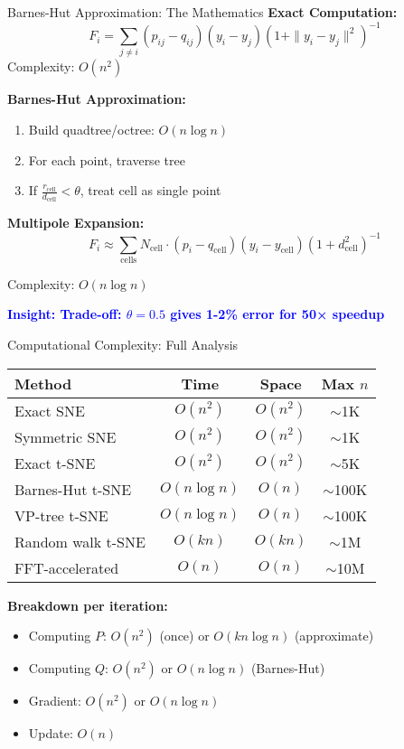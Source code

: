 \documentclass[aspectratio=169]{beamer}
\newcommand{\conceptbox}[2]{\colorbox{#1!20}{\textcolor{#1}{\textbf{#2}}}}
\newcommand{\insight}[1]{\conceptbox{blue}{Insight: #1}}
\begin{document}
\begin{frame}{Barnes-Hut Approximation: The Mathematics}
\textbf{Exact Computation:}
$$F_i = \sum_{j \neq i} (p_{ij} - q_{ij})(y_i - y_j)(1 + \|y_i - y_j\|^2)^{-1}$$
Complexity: $O(n^2)$

\textbf{Barnes-Hut Approximation:}
\begin{enumerate}
\item Build quadtree/octree: $O(n \log n)$
\item For each point, traverse tree
\item If $\frac{r_{\text{cell}}}{d_{\text{cell}}} < \theta$, treat cell as single point
\end{enumerate}

\textbf{Multipole Expansion:}
$$F_i \approx \sum_{\text{cells}} N_{\text{cell}} \cdot (p_i - q_{\text{cell}})(y_i - y_{\text{cell}})(1 + d_{\text{cell}}^2)^{-1}$$

Complexity: $O(n \log n)$

\insight{Trade-off: $\theta = 0.5$ gives 1-2\% error for 50× speedup}
\end{frame}

\begin{frame}{Computational Complexity: Full Analysis}
\begin{center}
\begin{tabular}{l|c|c|c}
\textbf{Method} & \textbf{Time} & \textbf{Space} & \textbf{Max $n$} \\
\hline
Exact SNE & $O(n^2)$ & $O(n^2)$ & $\sim$1K \\
Symmetric SNE & $O(n^2)$ & $O(n^2)$ & $\sim$1K \\
Exact t-SNE & $O(n^2)$ & $O(n^2)$ & $\sim$5K \\
Barnes-Hut t-SNE & $O(n \log n)$ & $O(n)$ & $\sim$100K \\
VP-tree t-SNE & $O(n \log n)$ & $O(n)$ & $\sim$100K \\
Random walk t-SNE & $O(kn)$ & $O(kn)$ & $\sim$1M \\
FFT-accelerated & $O(n)$ & $O(n)$ & $\sim$10M \\
\end{tabular}
\end{center}

\textbf{Breakdown per iteration:}
\begin{itemize}
\item Computing $P$: $O(n^2)$ (once) or $O(kn \log n)$ (approximate)
\item Computing $Q$: $O(n^2)$ or $O(n \log n)$ (Barnes-Hut)
\item Gradient: $O(n^2)$ or $O(n \log n)$
\item Update: $O(n)$
\end{itemize}
\end{frame}
\end{document}
